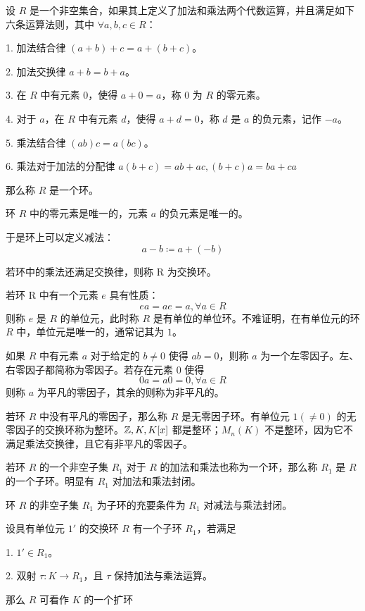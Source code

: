 \begin{definition}[环]
    设 $R$ 是一个非空集合，如果其上定义了加法和乘法两个代数运算，并且满足如下六条运算法则，其中 $\forall a,b,c\in R$：
    
    1. 加法结合律 $(a+b)+c = a+(b+c)$。
    
    2. 加法交换律 $a+b = b+a$。
    
    3. 在 $R$ 中有元素 $0$，使得 $a+0=a$，称 $0$ 为 $R$ 的零元素。
    
    4. 对于 $a$，在 $R$ 中有元素 $d$，使得 $a+d=0$，称 $d$ 是 $a$ 的负元素，记作 $-a$。
    
    5. 乘法结合律 $(ab)c = a(bc)$。
    
    6. 乘法对于加法的分配律 $a(b+c) = ab+ac,(b+c)a = ba+ca$
    
    那么称 $R$ 是一个环。
\end{definition}

\begin{theorem}
    环 $R$ 中的零元素是唯一的，元素 $a$ 的负元素是唯一的。
\end{theorem}

于是环上可以定义减法：
\[a-b \coloneqq  a + (-b)\]

若环中的乘法还满足交换律，则称 R 为交换环。

若环 R 中有一个元素 $e$ 具有性质：
\[ea = ae  = a, \forall a \in R\]
则称 $e$ 是 $R$ 的单位元，此时称 $R$ 是有单位的单位环。不难证明，在有单位元的环 $R$ 中，单位元是唯一的，通常记其为 $1$。

如果 $R$ 中有元素 $a$ 对于给定的 $b \ne 0$ 使得 $ab=0$，则称 $a$ 为一个左零因子。左、右零因子都简称为零因子。若存在元素 $0$ 使得
\[0a=a0=0, \forall a \in R\]
则称 $a$ 为平凡的零因子，其余的则称为非平凡的。

若环 $R$ 中没有平凡的零因子，那么称 $R$ 是无零因子环。有单位元 $1(\ne 0)$ 的无零因子的交换环称为整环。$\mathbb{Z},K,K[x]$ 都是整环；$M_n(K)$ 不是整环，因为它不满足乘法交换律，且它有非平凡的零因子。

若环 $R$ 的一个非空子集 $R_1$ 对于 $R$ 的加法和乘法也称为一个环，那么称 $R_1$ 是 $R$ 的一个子环。明显有 $R_1$ 对加法和乘法封闭。

\begin{theorem}
    环 $R$ 的非空子集 $R_1$ 为子环的充要条件为 $R_1$ 对减法与乘法封闭。
\end{theorem}

\begin{definition}
    设具有单位元 $1'$ 的交换环 $R$ 有一个子环 $R_1$，若满足
    
    1. $1' \in R_1$。
    
    2. 双射 $\tau : K \to R_1$，且 $\tau$ 保持加法与乘法运算。
    
    那么 $R$ 可看作 $K$ 的一个扩环
\end{definition}

